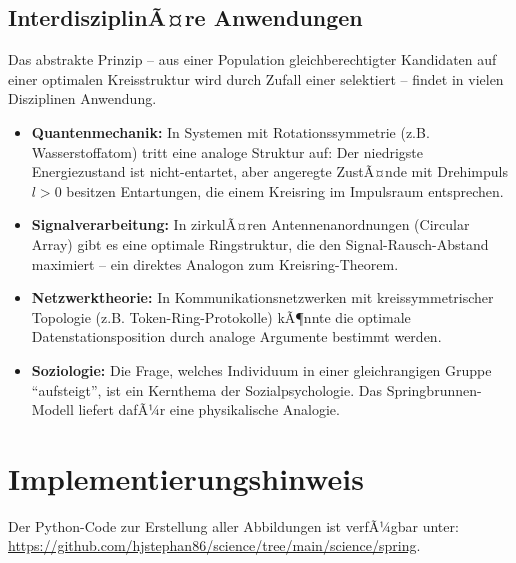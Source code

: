 ﻿\documentclass[a4paper,12pt]{article}
\theoremstyle{definition}
\begin{document}
\subsection{InterdisziplinÃ¤re Anwendungen}

Das abstrakte Prinzip -- aus einer Population gleichberechtigter Kandidaten auf einer
optimalen Kreisstruktur wird durch Zufall einer selektiert -- findet in vielen Disziplinen
Anwendung.

\begin{itemize}
    \item \textbf{Quantenmechanik:} In Systemen mit Rotationssymmetrie (z.B. Wasserstoffatom)
          tritt eine analoge Struktur auf: Der niedrigste Energiezustand ist nicht-entartet,
          aber angeregte ZustÃ¤nde mit Drehimpuls $l > 0$ besitzen Entartungen, die einem
          Kreisring im Impulsraum entsprechen.
    \item \textbf{Signalverarbeitung:} In zirkulÃ¤ren Antennenanordnungen (Circular Array)
          gibt es eine optimale Ringstruktur, die den Signal-Rausch-Abstand maximiert --
          ein direktes Analogon zum Kreisring-Theorem.
    \item \textbf{Netzwerktheorie:} In Kommunikationsnetzwerken mit kreissymmetrischer
          Topologie (z.B. Token-Ring-Protokolle) kÃ¶nnte die optimale Datenstationsposition
          durch analoge Argumente bestimmt werden.
    \item \textbf{Soziologie:} Die Frage, welches Individuum in einer gleichrangigen
          Gruppe ``aufsteigt'', ist ein Kernthema der Sozialpsychologie. Das Springbrunnen-
          Modell liefert dafÃ¼r eine physikalische Analogie.
\end{itemize}

\section*{Implementierungshinweis}

Der Python-Code zur Erstellung aller Abbildungen ist verfÃ¼gbar unter:
\url{https://github.com/hjstephan86/science/tree/main/science/spring}.
\end{document}
